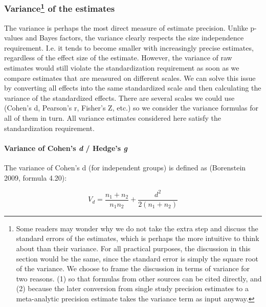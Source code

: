 \documentclass[]{article}
\let\oldparagraph\paragraph
\renewcommand{\paragraph}[1]{\oldparagraph{#1}\mbox{}}
\let\rmarkdownfootnote\footnote%
\def\footnote{\protect\rmarkdownfootnote}
\begin{document}
\hypertarget{variance-of-the-estimates}{%
\subsubsection[Variance of the
estimates]{\texorpdfstring{Variance\footnote{Some readers may wonder why
  we do not take the extra step and discuss the standard errors of the
  estimates, which is perhaps the more intuitive to think about than
  their variance. For all practical purposes, the discussion in this
  section would be the same, since the standard error is simply the
  square root of the variance. We choose to frame the discussion in
  terms of variance for two reasons. (1) so that formulas from other
  sources can be cited directly, and (2) because the later conversion
  from single study precision estimates to a meta-analytic precision
  estimate takes the variance term as input anyway. } of the
estimates}{Variance of the estimates}}\label{variance-of-the-estimates}}

The variance is perhaps the most direct measure of estimate precision.
Unlike p-values and Bayes factors, the variance clearly respects the
size independence requirement. I.e. it tends to become smaller with
increasingly precise estimates, regardless of the effect size of the
estimate. However, the variance of raw estimates would still violate the
standardization requirement as soon as we compare estimates that are
measured on different scales. We can solve this issue by converting all
effects into the same standardized scale and then calculating the
variance of the standardized effects. There are several scales we could
use (Cohen's d, Pearson's r, Fisher's Z, etc.) so we consider the
variance formulas for all of them in turn. All variance estimates
considered here satisfy the standardization requirement.

\hypertarget{variance-of-cohens-d-hedges-g}{%
\paragraph{\texorpdfstring{Variance of Cohen's \emph{d} / Hedge's
\emph{g}}{Variance of Cohen's d / Hedge's g}}\label{variance-of-cohens-d-hedges-g}}

The variance of Cohen's d (for independent groups) is defined as
(Borenstein 2009, formula 4.20):

\[
\begin{equation}
V_d=\frac{n_1+n_2}{n_1n_2}+\frac{d^2}{2(n_1+n_2)}
\label{eq:vardbet}
\tag{2}
\end{equation}
\]
\end{document}
